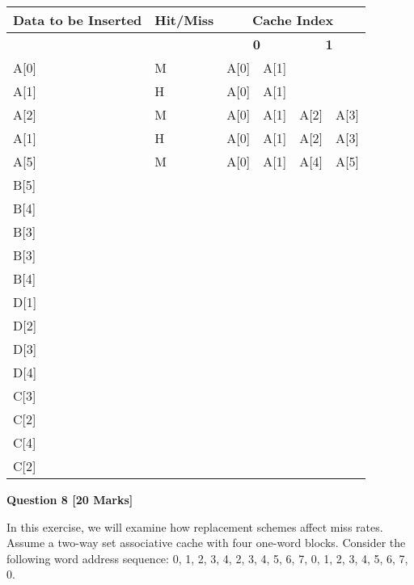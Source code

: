 \documentclass[addpoints]{exam}
\begin{document}
\begin{sloppypar}
\begin{questions}
\begin{parts}
        \begin{tabular}{|m{17mm} | m{17mm} | m{17mm} |m{17mm} |m{17mm} |m{17mm}|}
            \hline
            \raggedright \textbf{Data to \hspace*{3.5mm} be Inserted} &\raggedright \textbf{Hit/Miss} & \multicolumn{4}{|c|}{\textbf{Cache Index}} \\ \hline 
            & & \multicolumn{2}{|c|}{\textbf{0}} & \multicolumn{2}{|c|}{\textbf{1}} \\ \hline
            A[0] & M & A[0] & A[1] & & \\ \hline
            A[1] & H & A[0] & \textcolor{my_green}{A[1]} & & \\ \hline
            A[2] & M & A[0] & A[1] & A[2] & A[3] \\ \hline
            A[1] & H & A[0] & \textcolor{my_green}{A[1]} & A[2] & A[3] \\ \hline
            A[5] & M & A[0] & A[1] & A[4] & A[5] \\ \hline
            B[5] & & & & & \\ \hline
            B[4] & & & & & \\ \hline
            B[3] & & & & & \\ \hline
            B[3] & & & & & \\ \hline
            B[4] & & & & & \\ \hline
            D[1] & & & & & \\ \hline
            D[2] & & & & & \\ \hline
            D[3] & & & & & \\ \hline
            D[4] & & & & & \\ \hline
            C[3] & & & & & \\ \hline
            C[2] & & & & & \\ \hline
            C[4] & & & & & \\ \hline
            C[2] & & & & & \\ \hline
        \end{tabular}

    \end{parts}
    \pagebreak
    \question[20]
    \begin{center}
        \textbf{Question 8 [20 Marks]}
    \end{center}

    In this exercise, we will examine how replacement schemes affect miss rates. Assume a two-way set associative cache with four one-word blocks. Consider the following word address sequence: 0, 1, 2, 3, 4, 2, 3, 4, 5, 6, 7, 0, 1, 2, 3, 4, 5, 6, 7, 0.


\end{questions}
\end{sloppypar}
\end{document}
